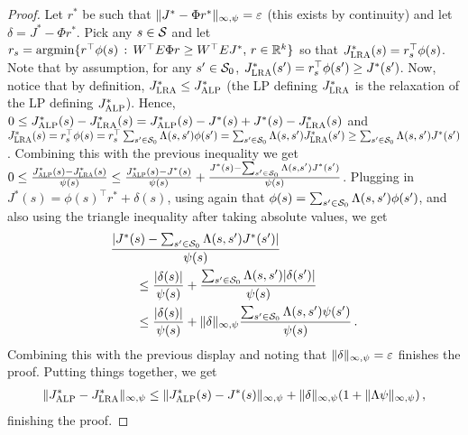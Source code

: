 \documentclass[twocolumn]{IEEEtran}
\begin{document}
\begin{proof}
Let $r^*$ be such that $\norm{J^* - \Phi r^*}_{\infty,\psi} = \epsilon$ (this exists by continuity) and let 
$\delta = J^* - \Phi r^*$.
Pick any $s\in \S$ and let $r_s = \argmin\{ r^\top \phi(s) \,:\, W^\top E \Phi r \ge W^\top E J^*,\, r\in \Re^k \}$ 
so that $\Jlro(s) = r_s^\top \phi(s)$.
Note that by assumption, for any $s'\in \S_0$, $\Jlro(s') = r_s^\top \phi(s') \ge J^*(s')$.
Now, notice that by definition, $\Jlro \le \Jalpo$ (the LP defining $\Jlro$ is the relaxation of the LP defining $\Jalpo$).
Hence,
$%
0\le \Jalpo(s) - \Jlro(s) = \Jalpo(s) - J^*(s) + J^*(s) - \Jlro(s)
$%
and $\Jlro(s) = r_s^\top \phi(s) = r_s^\top \sum_{s'\in \S_0} \Lambda(s,s') \phi(s') = \sum_{s'\in \S_0} \Lambda(s,s') \Jlro(s')
\ge \sum_{s'\in \S_0} \Lambda(s,s') J^*(s')$.
Combining this with the previous inequality we get
$%
0\le
 \frac{\Jalpo(s) - \Jlro(s)}{\psi(s)}\\
 \le
\frac{\Jalpo(s)-J^*(s)}{\psi(s)} + \frac{J^*(s) - \sum_{s'\in \S_0} \Lambda(s,s') J^*(s')}{\psi(s)}
$. %
Plugging in $J^*(s) = \phi(s)^\top r^*+\delta(s)$, using again that $\phi(s) = \sum_{s'\in \S_0} \Lambda(s,s') \phi(s')$,
and also using the triangle inequality after taking absolute values, we get
\begin{align*}
\MoveEqLeft \frac{|J^*(s) - \sum_{s'\in \S_0} \Lambda(s,s') J^*(s')|}{\psi(s)} \\
& \le
  \frac{|\delta(s)|}{\psi(s)} + \frac{\sum_{s'\in \S_0} \Lambda(s,s') |\delta(s')|}{\psi(s)} \\
& \le
  \frac{|\delta(s)|}{\psi(s)} + \norm{\delta}_{\infty,\psi} \frac{\sum_{s'\in \S_0} \Lambda(s,s') \psi(s')}{\psi(s)} \, .
\end{align*}
Combining this with the previous display and noting that $\norm{\delta}_{\infty,\psi} = \epsilon$ finishes the proof.
Putting things together, we get 
\begin{align*}
\norm{\Jalpo - \Jlro}_{\infty,\psi}
\le
\norm{\Jalpo(s)-J^*(s)}_{\infty,\psi}
+ 
\norm{\delta}_{\infty,\psi} (1+ \norm{\Lambda \psi}_{\infty,\psi})\,,
\end{align*}
finishing the proof.
\fi
\end{proof}
\end{document}
